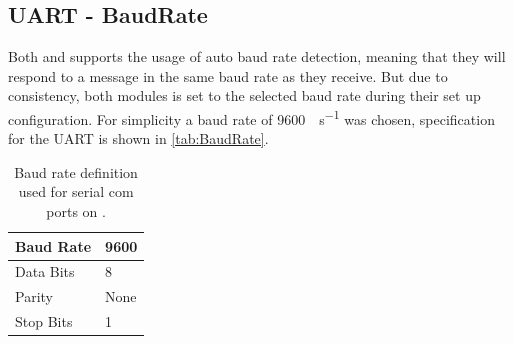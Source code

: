 \subsection{UART - BaudRate}
Both \SARA and \GPS supports the usage of auto baud rate detection, meaning that they will respond to a message in the same baud rate as they receive.
But due to consistency, both modules is set to the selected baud rate during their set up configuration. 
For simplicity a baud rate of \SI[per-mode = symbol]{9600}{\bit\per\second} was chosen, specification for the UART is shown in \vref{tab:BaudRate}.

\begin{table}[H]
	\begin{tabular}{ll}
		\hline 
		Baud Rate & 9600 \\ 
		\hline 
		Data Bits & 8 \\ 
		\hline 
		Parity & None \\ 
		\hline 
		Stop Bits & 1 \\ 
		\hline 
	\end{tabular}
	\centering
	\caption{Baud rate definition used for serial com ports on \SAMD.}
	\label{tab:BaudRate}
\end{table} 

\FloatBarrier